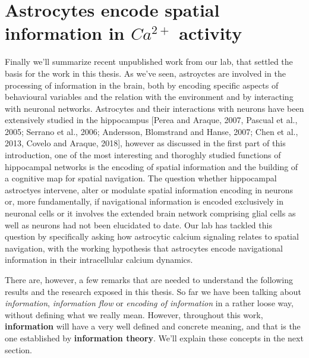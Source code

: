 \section{Astrocytes encode spatial information in $Ca^{2+}$ activity}
\label{chap1:sec3:astro_spat_info}
Finally we'll summarize recent unpublished work from our lab, that settled the basis for the work in this thesis.
As we've seen, astroyctes are involved in the processing of information in the brain, both by encoding specific aspects of behavioural variables and the relation with the environment and by interacting with neuronal networks. 
Astrocytes and their interactions with neurons have been extensively studied in the hippocampus [Perea and Araque, 2007, Pascual et al., 2005; Serrano et al., 2006; Andersson, Blomstrand and Hanse, 2007; Chen et al., 2013, Covelo and Araque, 2018], however as discussed in the first part of this introduction, one of the most interesting and thoroghly studied functions of hippocampal networks is the encoding of spatial information and the building of a cognitive map for spatial navigation.
The question whether hippocampal astroctyes intervene, alter or modulate spatial information encoding in neurons or, more fundamentally, if navigational information is encoded exclusively in neuronal cells or it involves the extended brain network comprising glial cells as well as neurons had not been elucidated to date. 
Our lab has tackled this question by specifically asking how astrocytic calcium signaling relates to spatial navigation, with the working hypothesis that astrocytes encode navigational information in their intracellular calcium dynamics. 

There are, however, a few remarks that are needed to understand the following results and the research exposed in this thesis.
So far we have been talking about \textit{information}, \textit{information flow} or \textit{encoding of information} in a rather loose way, without defining what we really mean. 
However, throughout this work, \textbf{information} will have a very well defined and concrete meaning, and that is the one established by \textbf{information theory}.
We'll explain these concepts in the next section.

